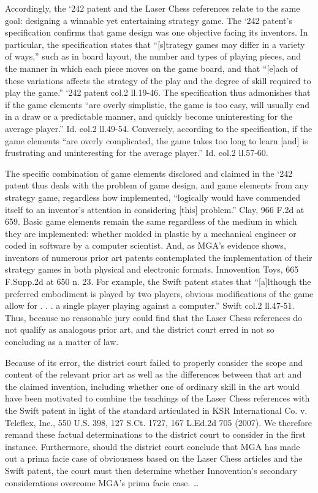 Accordingly, the `242 patent and the Laser Chess references relate to the same
goal: designing a winnable yet entertaining strategy game. The `242 patent's
specification confirms that game design was one objective facing its inventors.
In particular, the specification states that ``[s]trategy games may differ in a
variety of ways,'' such as in board layout, the number and types of playing
pieces, and the manner in which each piece moves on the game board, and that
``[e]ach of these variations affects the strategy of the play and the degree of
skill required to play the game.'' `242 patent col.2 ll.19-46. The
specification thus admonishes that if the game elements ``are overly
simplistic, the game is too easy, will usually end in a draw or a predictable
manner, and quickly become uninteresting for the average player.'' Id. col.2
ll.49-54. Conversely, according to the specification, if the game elements
``are overly complicated, the game takes too long to learn [and] is frustrating
and uninteresting for the average player.'' Id. col.2 ll.57-60.

The specific combination of game elements disclosed and claimed in the `242
patent thus deals with the problem of game design, and game elements from any
strategy game, regardless how implemented, ``logically would have commended
itself to an inventor's attention in considering [this] problem.'' Clay, 966
F.2d at 659. Basic game elements remain the same regardless of the medium in
which they are implemented: whether molded in plastic by a mechanical engineer
or coded in software by a computer scientist. And, as MGA's evidence shows,
inventors of numerous prior art patents contemplated the implementation of
their strategy games in both physical and electronic formats. Innovention Toys,
665 F.Supp.2d at 650 n. 23. For example, the Swift patent states that
``[a]lthough the preferred embodiment is played by two players, obvious
modifications of the game allow for . . . a single player playing against a
computer.'' Swift col.2 ll.47-51. Thus, because no reasonable jury could find
that the Laser Chess references do not qualify as analogous prior art, and the
district court erred in not so concluding as a matter of law.

Because of its error, the district court failed to properly consider the scope
and content of the relevant prior art as well as the differences between that
art and the claimed invention, including whether one of ordinary skill in the
art would have been motivated to combine the teachings of the Laser Chess
references with the Swift patent in light of the standard articulated in KSR
International Co. v. Teleflex, Inc., 550 U.S. 398, 127 S.Ct. 1727, 167 L.Ed.2d
705 (2007). We therefore remand these factual determinations to the district
court to consider in the first instance. Furthermore, should the district court
conclude that MGA has made out a prima facie case of obviousness based on the
Laser Chess articles and the Swift patent, the court must then determine
whether Innovention's secondary considerations overcome MGA's prima facie case.
{\dots}

